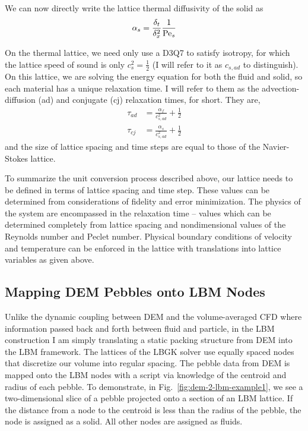 We can now directly write the lattice thermal diffusivity of the solid as
\begin{equation}
	\alpha_s = \frac{\delta_t}{\delta_x^2}\frac{1}{\mathrm{Pe}_s}
\end{equation}

On the thermal lattice, we need only use a D3Q7 to satisfy isotropy, for which the lattice speed of sound is only $c_s^2 = \frac{1}{2}$ (I will refer to it as $c_{s,ad}$ to distinguish). On this lattice, we are solving the energy equation for both the fluid and solid, so each material has a unique relaxation time. I will refer to them as the advection-diffusion (ad) and conjugate (cj) relaxation times, for short. They are,
\begin{subequations}
\begin{align}
	\tau_{ad} &= \frac{\alpha_f}{c_{s,ad}^2} + \frac{1}{2} \\
	\tau_{cj} &= \frac{\alpha_s}{c_{s,ad}^2} + \frac{1}{2}
\end{align}
\end{subequations}
and the size of lattice spacing and time steps are equal to those of the Navier-Stokes lattice.

To summarize the unit conversion process described above, our lattice needs to be defined in terms of lattice spacing and time step. These values can be determined from considerations of fidelity and error minimization. The physics of the system are encompassed in the relaxation time -- values which can be determined completely from lattice spacing and nondimensional values of the Reynolds number and Peclet number. Physical boundary conditions of velocity and temperature can be enforced in the lattice with translations into lattice variables as given above. %




\subsection{Mapping DEM Pebbles onto LBM Nodes}\label{sec:dem2lbm-mapping}

Unlike the dynamic coupling between DEM and the volume-averaged CFD where information passed back and forth between fluid and particle, in the LBM construction I am simply translating a static packing structure from DEM into the LBM framework. The lattices of the LBGK solver use equally spaced nodes that discretize our volume into regular spacing. The pebble data from DEM is mapped onto the LBM nodes with a script via knowledge of the centroid and radius of each pebble. To demonstrate, in Fig.~\ref{fig:dem-2-lbm-example1}, we see a two-dimensional slice of a pebble projected onto a section of an LBM lattice. If the distance from a node to the centroid is less than the radius of the pebble, the node is assigned as a solid. All other nodes are assigned as fluids.

